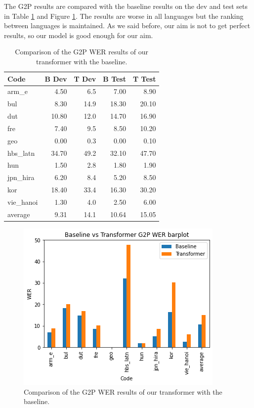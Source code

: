 \documentclass[11pt,a4paper]{article}
\begin{document}
The G2P results are compared with the baseline results on the dev and test sets in Table \ref{tab:baseline} and Figure \ref{fig:g2p_baseline}. The results are worse in all languages but the ranking between languages is maintained. As we said before, our aim is not to get perfect results, so our model is good enough for our aim.

\begin{table}[ht]
\centering
\begin{tabular}{lrrrr}
\toprule
      Code &  B Dev &  T Dev &  B Test &  T Test \\
\midrule
     arm\_e &          4.50 &   6.5 &           7.00 &   8.90 \\
       bul &          8.30 &  14.9 &          18.30 &  20.10 \\
       dut &         10.80 &  12.0 &          14.70 &  16.90 \\
       fre &          7.40 &   9.5 &           8.50 &  10.20 \\
       geo &          0.00 &   0.3 &           0.00 &   0.10 \\
  hbs\_latn &         34.70 &  49.2 &          32.10 &  47.70 \\
       hun &          1.50 &   2.8 &           1.80 &   1.90 \\
  jpn\_hira &          6.20 &   8.4 &           5.20 &   8.50 \\
       kor &         18.40 &  33.4 &          16.30 &  30.20 \\
 vie\_hanoi &          1.30 &   4.0 &           2.50 &   6.00 \\
\midrule
   average &          9.31 &  14.1 &          10.64 &  15.05 \\
\bottomrule
\end{tabular}
\caption{Comparison of the G2P WER results of our transformer with the baseline.}
\label{tab:baseline}
\end{table}

\begin{figure}[ht]
    \centering
    \includegraphics[width=\linewidth]{g2p_baseline.png}
    \caption{Comparison of the G2P WER results of our transformer with the baseline.}
    \label{fig:g2p_baseline}
\end{figure}
\end{document}
